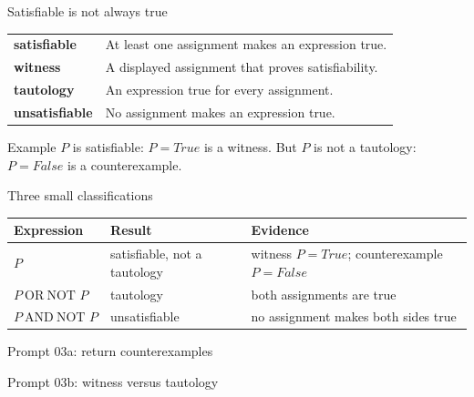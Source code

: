 \begin{frame}{Satisfiable is not always true}
\begin{tabular}{@{}p{3.2cm}p{8.8cm}@{}}
\textbf{satisfiable} & At least one assignment makes an expression true.\\[4pt]
\textbf{witness} & A displayed assignment that proves satisfiability.\\[4pt]
\textbf{tautology} & An expression true for every assignment.\\[4pt]
\textbf{unsatisfiable} & No assignment makes an expression true.
\end{tabular}
\begin{block}{Example}
$P$ is satisfiable: $P=True$ is a witness. But $P$ is not a tautology: $P=False$ is a counterexample.
\end{block}
\end{frame}

\begin{frame}{Three small classifications}
\begin{tabular}{@{}l l l@{}}
\textbf{Expression} & \textbf{Result} & \textbf{Evidence}\\\midrule
$P$ & satisfiable, not a tautology & witness $P=True$; counterexample $P=False$\\[4pt]
$P\ \text{OR}\ \text{NOT }P$ & tautology & both assignments are true\\[4pt]
$P\ \text{AND}\ \text{NOT }P$ & unsatisfiable & no assignment makes both sides true
\end{tabular}
\medskip
{}
\end{frame}

\begin{frame}[fragile]{Prompt 03a: return counterexamples}
\end{frame}

\begin{frame}[fragile]{Prompt 03b: witness versus tautology}
\end{frame}

